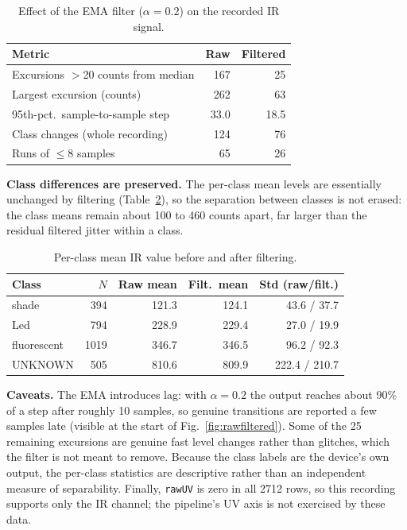 \documentclass[conference]{IEEEtran}
\begin{document}
\begin{table}[H]
    \centering
    \caption{Effect of the EMA filter ($\alpha=0.2$) on the recorded IR signal.}
    \label{tab:filter}
    \footnotesize\setlength{\tabcolsep}{3pt}
    \begin{tabular}{lrr}
        \toprule
        Metric & Raw & Filtered\\
        \midrule
        Excursions $>$20 counts from median & 167 & 25\\
        Largest excursion (counts) & 262 & 63\\
        95th-pct.\ sample-to-sample step & 33.0 & 18.5\\
        Class changes (whole recording) & 124 & 76\\
        Runs of $\leq$8 samples & 65 & 26\\
        \bottomrule
    \end{tabular}
\end{table}

\textbf{Class differences are preserved.} The per-class mean levels are essentially unchanged by filtering (Table~\ref{tab:means}), so the separation between classes is not erased: the class means remain about 100 to 460 counts apart, far larger than the residual filtered jitter within a class.

\begin{table}[H]
    \centering
    \caption{Per-class mean IR value before and after filtering.}
    \label{tab:means}
    \footnotesize\setlength{\tabcolsep}{3pt}
    \begin{tabular}{lrrrr}
        \toprule
        Class & $N$ & Raw mean & Filt.\ mean & Std (raw/filt.)\\
        \midrule
        shade & 394 & 121.3 & 124.1 & 43.6 / 37.7\\
        Led & 794 & 228.9 & 229.4 & 27.0 / 19.9\\
        fluorescent & 1019 & 346.7 & 346.5 & 96.2 / 92.3\\
        UNKNOWN & 505 & 810.6 & 809.9 & 222.4 / 210.7\\
        \bottomrule
    \end{tabular}
\end{table}

\textbf{Caveats.} The EMA introduces lag: with $\alpha=0.2$ the output reaches about 90\% of a step after roughly 10 samples, so genuine transitions are reported a few samples late (visible at the start of Fig.~\ref{fig:rawfiltered}). Some of the 25 remaining excursions are genuine fast level changes rather than glitches, which the filter is not meant to remove. Because the class labels are the device's own output, the per-class statistics are descriptive rather than an independent measure of separability. Finally, \texttt{rawUV} is zero in all 2712 rows, so this recording supports only the IR channel; the pipeline's UV axis is not exercised by these data.
\end{document}
